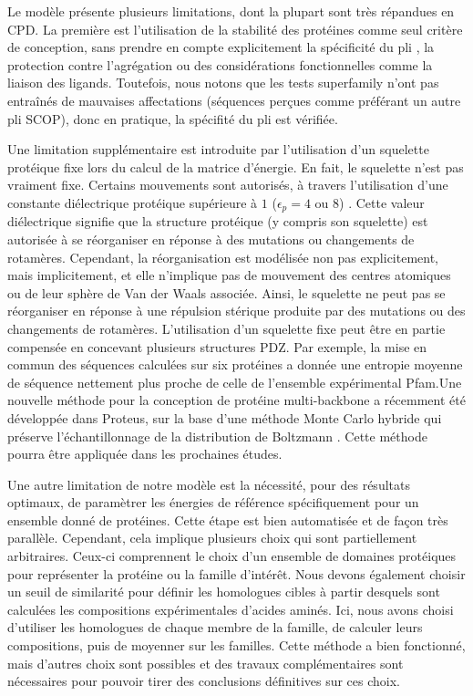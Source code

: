 Le modèle présente plusieurs limitations, dont la plupart sont très répandues en CPD. La première est l'utilisation de la stabilité des protéines comme seul critère de conception, sans prendre en compte explicitement la spécificité du pli \cite{Schmidt08, Simonson13}, la protection contre l'agrégation ou des considérations fonctionnelles comme la liaison des ligands. Toutefois, nous notons que les tests superfamily n'ont pas entraînés de mauvaises affectations (séquences perçues comme préférant un autre pli SCOP), donc en pratique, la spécifité du pli est vérifiée.

Une limitation supplémentaire est introduite par l'utilisation d'un squelette protéique fixe lors du calcul de la matrice d'énergie. En fait, le squelette n'est pas vraiment fixe. Certains mouvements sont autorisés, à travers l'utilisation d'une constante diélectrique protéique supérieure à $1$ ($\epsilon_p= 4$ ou $8$) \cite{Simonson13}. Cette valeur diélectrique signifie que la structure protéique (y compris son squelette) est autorisée à se réorganiser en réponse à des mutations ou changements de rotamères. Cependant, la réorganisation est modélisée non pas explicitement, mais implicitement, et elle n'implique pas de mouvement des centres atomiques ou de leur sphère de Van der Waals associée. Ainsi, le squelette ne peut pas se réorganiser en réponse à une répulsion stérique produite par des mutations ou des changements de rotamères. L'utilisation d'un squelette fixe peut être en partie compensée en concevant plusieurs structures PDZ. Par exemple, la mise en commun des séquences calculées sur six protéines a donnée une entropie moyenne de séquence nettement plus proche de celle de l'ensemble expérimental  Pfam.Une nouvelle méthode pour la conception de protéine multi-backbone a récemment été développée dans Proteus, sur la base d'une méthode Monte Carlo hybride qui préserve l'échantillonnage de la distribution de Boltzmann \cite{Druart17}. Cette méthode pourra être appliquée dans les prochaines études.

Une autre limitation de notre modèle est la nécessité, pour des résultats optimaux, de paramètrer les énergies de référence spécifiquement pour un ensemble donné de protéines. Cette étape est bien automatisée et de façon très parallèle. Cependant, cela implique plusieurs choix qui sont partiellement arbitraires. Ceux-ci comprennent le choix d'un ensemble de domaines protéiques pour représenter la protéine ou la famille d'intérêt. Nous devons également choisir un seuil de similarité pour définir les homologues cibles à partir desquels sont calculées les compositions expérimentales d'acides aminés. Ici, nous avons choisi d'utiliser les homologues de chaque membre de la famille, de calculer leurs compositions, puis de moyenner sur les familles. Cette méthode a bien fonctionné, mais d'autres choix sont possibles et des travaux complémentaires sont nécessaires pour pouvoir tirer des conclusions définitives sur ces choix.

